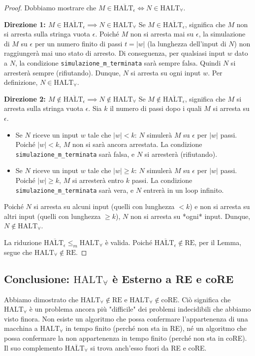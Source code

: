 \documentclass[a4paper, 11pt]{book} %
\theoremstyle{definition}
\begin{document}
\begin{proof}
Dobbiamo mostrare che $M \in \overline{\text{HALT}_\epsilon} \iff N \in \text{HALT}_\forall$.

\textbf{Direzione 1: $M \in \overline{\text{HALT}_\epsilon} \implies N \in \text{HALT}_\forall$}
Se $M \in \overline{\text{HALT}_\epsilon}$, significa che $M$ non si arresta sulla stringa vuota $\epsilon$.
Poiché $M$ non si arresta mai su $\epsilon$, la simulazione di $M$ su $\epsilon$ per un numero finito di passi $t = |w|$ (la lunghezza dell'input di $N$) non raggiungerà mai uno stato di arresto.
Di conseguenza, per qualsiasi input $w$ dato a $N$, la condizione \texttt{simulazione\_m\_terminata} sarà sempre falsa. Quindi $N$ si arresterà sempre (rifiutando).
Dunque, $N$ si arresta su ogni input $w$. Per definizione, $N \in \text{HALT}_\forall$.

\textbf{Direzione 2: $M \notin \overline{\text{HALT}_\epsilon} \implies N \notin \text{HALT}_\forall$}
Se $M \notin \overline{\text{HALT}_\epsilon}$, significa che $M$ si arresta sulla stringa vuota $\epsilon$.
Sia $k$ il numero di passi dopo i quali $M$ si arresta su $\epsilon$.
\begin{itemize}
    \item Se $N$ riceve un input $w$ tale che $|w| < k$:
    $N$ simulerà $M$ su $\epsilon$ per $|w|$ passi. Poiché $|w| < k$, $M$ non si sarà ancora arrestata. La condizione \texttt{simulazione\_m\_terminata} sarà falsa, e $N$ si arresterà (rifiutando).
    \item Se $N$ riceve un input $w$ tale che $|w| \ge k$:
    $N$ simulerà $M$ su $\epsilon$ per $|w|$ passi. Poiché $|w| \ge k$, $M$ si arresterà entro $k$ passi. La condizione \texttt{simulazione\_m\_terminata} sarà vera, e $N$ entrerà in un loop infinito.
\end{itemize}
Poiché $N$ si arresta su alcuni input (quelli con lunghezza $< k$) e non si arresta su altri input (quelli con lunghezza $\ge k$), $N$ non si arresta su *ogni* input.
Dunque, $N \notin \text{HALT}_\forall$.

La riduzione $\overline{\text{HALT}_\epsilon} \le_m \text{HALT}_\forall$ è valida.
Poiché $\overline{\text{HALT}_\epsilon} \notin \text{RE}$, per il Lemma, segue che $\text{HALT}_\forall \notin \text{RE}$.
\end{proof}

\subsection{Conclusione: $\text{HALT}_\forall$ è Esterno a RE e coRE}
Abbiamo dimostrato che $\text{HALT}_\forall \notin \text{RE}$ e $\text{HALT}_\forall \notin \text{coRE}$.
Ciò significa che $\text{HALT}_\forall$ è un problema ancora più "difficile" dei problemi indecidibili che abbiamo visto finora. Non esiste un algoritmo che possa confermare l'appartenenza di una macchina a $\text{HALT}_\forall$ in tempo finito (perché non sta in RE), né un algoritmo che possa confermare la non appartenenza in tempo finito (perché non sta in coRE).
Il suo complemento $\overline{\text{HALT}_\forall}$ si trova anch'esso fuori da RE e coRE.
\end{document}
